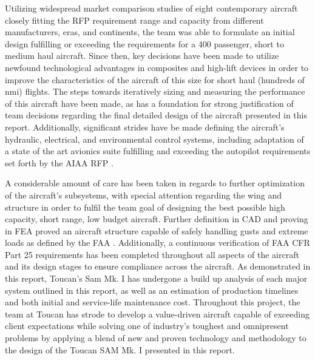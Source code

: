 Utilizing widespread market comparison studies of eight contemporary aircraft closely fitting the RFP \cite{RFP} requirement range and capacity from different manufacturers, eras, and continents, the team was able to formulate an initial design fulfilling or exceeding the requirements for a 400 passenger, short to medium haul aircraft. Since then, key decisions have been made to utilize newfound technological advantages in composites and high-lift devices in order to improve the characteristics of the aircraft of this size for short haul (hundreds of nmi) flights.  The steps towards iteratively sizing and measuring the performance of this aircraft have been made, as has a foundation for strong justification of team decisions regarding the final detailed design of the aircraft presented in this report.  Additionally, significant strides have be made defining the aircraft's hydraulic, electrical, and environmental control systems, including adaptation of a state of the art avionics suite fulfilling and exceeding the autopilot requirements set forth by the AIAA RFP \cite{RFP}.

A considerable amount of care has been taken in regards to further optimization of the aircraft's subsystems, with special attention regarding the wing and structure in order to fulfil the team goal of designing the best possible high capacity, short range, low budget aircraft. Further definition in CAD and proving in FEA proved an aircraft structure capable of safely handling gusts and extreme loads as defined by the FAA \cite{cfr}.  Additionally, a continuous verification of FAA CFR Part 25 \cite{cfr} requirements has been completed throughout all aspects of the aircraft and its design stages to ensure compliance across the aircraft.  As demonstrated in this report, Toucan's Sam Mk. I has undergone a build up analysis of each major system outlined in this report, as well as an estimation of production timelines and both initial and service-life maintenance cost.  Throughout this project, the team at Toucan has strode to develop a value-driven aircraft capable of exceeding client expectations while solving one of industry's toughest and omnipresent problems by applying a blend of new and proven technology and methodology to the design of the Toucan SAM Mk. I presented in this report.  




